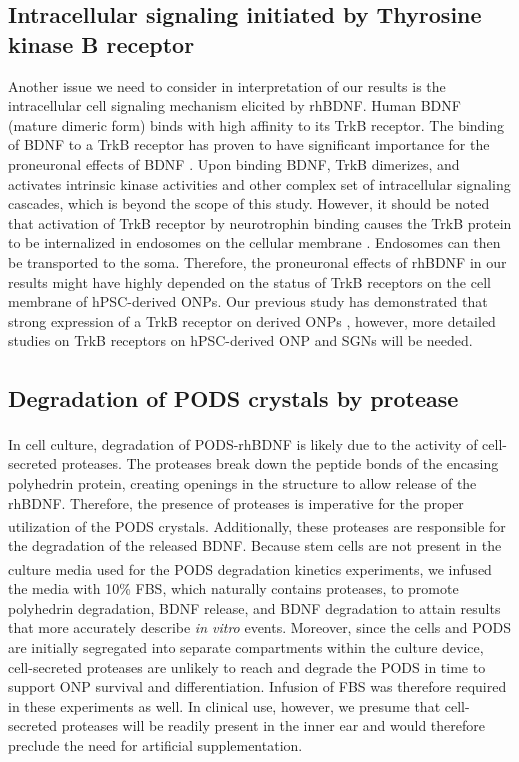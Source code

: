 \documentclass[review]{elsarticle}
\begin{document}
\subsection{Intracellular signaling initiated by Thyrosine kinase B receptor}
Another issue we need to consider in interpretation of our results is the intracellular cell signaling mechanism elicited by rhBDNF. Human BDNF (mature dimeric form) binds with high affinity to its TrkB receptor. The binding of BDNF to a TrkB receptor has proven to have significant importance for the proneuronal effects of BDNF \cite{green2012}. Upon binding BDNF, TrkB dimerizes, and activates intrinsic kinase activities and other complex set of intracellular signaling cascades, which is beyond the scope of this study. However, it should be noted that activation of TrkB receptor by neurotrophin binding causes the TrkB protein to be internalized in endosomes on the cellular membrane \cite{Numakawa2010}. Endosomes can then be transported to the soma. Therefore, the proneuronal effects of rhBDNF in our results might have highly depended on the status of TrkB receptors on the cell membrane of hPSC-derived ONPs. Our previous study has demonstrated that strong expression of a TrkB receptor on derived ONPs \cite{Matsuoka2017}, however, more detailed studies on TrkB receptors on hPSC-derived ONP and SGNs will be needed.

\subsection{Degradation of PODS\textsuperscript{\textregistered} crystals by protease}
In cell culture, degradation of PODS\textsuperscript{\textregistered}-rhBDNF is likely due to the activity of cell-secreted proteases. The proteases break down the peptide bonds of the encasing polyhedrin protein, creating openings in the structure to allow release of the rhBDNF. Therefore, the presence of proteases is imperative for the proper utilization of the PODS\textsuperscript{\textregistered} crystals. Additionally, these proteases are responsible for the degradation of the released BDNF. Because stem cells are not present in the culture media used for the PODS\textsuperscript{\textregistered} degradation kinetics experiments, we infused the media with 10\% FBS, which naturally contains proteases, to promote polyhedrin degradation, BDNF release, and BDNF degradation to attain results that more accurately describe \textit{in vitro} events. Moreover, since the cells and PODS are initially segregated into separate compartments within the culture device, cell-secreted proteases are unlikely to reach and degrade the PODS in time to support ONP survival and differentiation. Infusion of FBS was therefore required in these experiments as well. In clinical use, however, we presume that cell-secreted proteases will be readily present in the inner ear and would therefore preclude the need for artificial supplementation.
\end{document}
